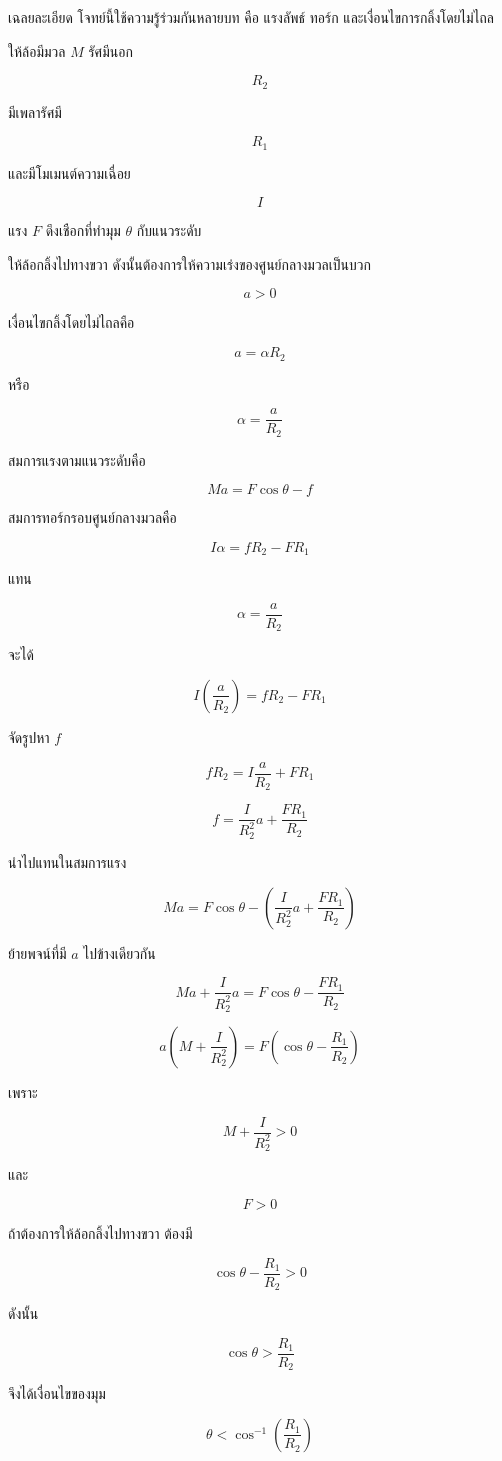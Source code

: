 \begin{examplebox}{เฉลยละเอียด}
โจทย์นี้ใช้ความรู้ร่วมกันหลายบท คือ แรงลัพธ์ ทอร์ก และเงื่อนไขการกลิ้งโดยไม่ไถล

ให้ล้อมีมวล \(M\) รัศมีนอก

\[
R_2
\]

มีเพลารัศมี

\[
R_1
\]

และมีโมเมนต์ความเฉื่อย

\[
I
\]

แรง \(F\) ดึงเชือกที่ทำมุม \(\theta\) กับแนวระดับ

ให้ล้อกลิ้งไปทางขวา ดังนั้นต้องการให้ความเร่งของศูนย์กลางมวลเป็นบวก

\[
a>0
\]

เงื่อนไขกลิ้งโดยไม่ไถลคือ

\[
a=\alpha R_2
\]

หรือ

\[
\alpha=\frac{a}{R_2}
\]

สมการแรงตามแนวระดับคือ

\[
Ma=F\cos\theta-f
\]

สมการทอร์กรอบศูนย์กลางมวลคือ

\[
I\alpha=fR_2-FR_1
\]

แทน

\[
\alpha=\frac{a}{R_2}
\]

จะได้

\[
I\left(\frac{a}{R_2}\right)=fR_2-FR_1
\]

จัดรูปหา \(f\)

\[
fR_2=I\frac{a}{R_2}+FR_1
\]

\[
f=\frac{I}{R_2^2}a+\frac{FR_1}{R_2}
\]

นำไปแทนในสมการแรง

\[
Ma=F\cos\theta-\left(\frac{I}{R_2^2}a+\frac{FR_1}{R_2}\right)
\]

ย้ายพจน์ที่มี \(a\) ไปข้างเดียวกัน

\[
Ma+\frac{I}{R_2^2}a
=
F\cos\theta-\frac{FR_1}{R_2}
\]

\[
a\left(M+\frac{I}{R_2^2}\right)
=
F\left(\cos\theta-\frac{R_1}{R_2}\right)
\]

เพราะ

\[
M+\frac{I}{R_2^2}>0
\]

และ

\[
F>0
\]

ถ้าต้องการให้ล้อกลิ้งไปทางขวา ต้องมี

\[
\cos\theta-\frac{R_1}{R_2}>0
\]

ดังนั้น

\[
\cos\theta>\frac{R_1}{R_2}
\]

จึงได้เงื่อนไขของมุม

\[
\boxed{\theta<\cos^{-1}\left(\frac{R_1}{R_2}\right)}
\]
\end{examplebox}

